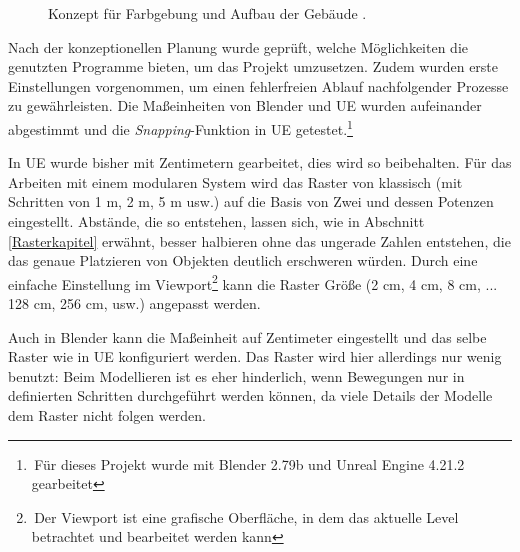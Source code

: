 \begin{figure}[!h]
\centering
  \caption{Konzept für Farbgebung und Aufbau der Gebäude \parencite{JapanConcept}.}
	\label{JapanKonzept}
\end{figure}
\newpage
Nach der konzeptionellen Planung wurde geprüft, welche Möglichkeiten die genutzten Programme bieten, um das Projekt umzusetzen. Zudem wurden erste Einstellungen vorgenommen, um einen fehlerfreien Ablauf nachfolgender Prozesse zu gewährleisten. Die Maßeinheiten von Blender und UE wurden aufeinander abgestimmt und die \textit{Snapping}-Funktion in UE getestet.\footnote{\,Für dieses Projekt wurde mit Blender 2.79b und Unreal Engine 4.21.2 gearbeitet}
\par
In UE wurde bisher mit Zentimetern gearbeitet, dies wird so beibehalten. Für das Arbeiten mit einem modularen System wird das Raster von klassisch (mit Schritten von 1 m, 2 m, 5 m usw.) auf die Basis von Zwei und dessen Potenzen eingestellt. Abstände, die so entstehen, lassen sich, wie in Abschnitt \ref{Rasterkapitel} erwähnt, besser halbieren ohne das ungerade Zahlen entstehen, die das genaue Platzieren von Objekten deutlich erschweren würden. Durch eine einfache Einstellung im Viewport\footnote{\,Der Viewport ist eine grafische Oberfläche, in dem das aktuelle Level betrachtet und bearbeitet werden kann} kann die Raster Größe (2 cm, 4 cm, 8 cm, ... 128 cm, 256 cm, usw.) angepasst werden.
\par
Auch in Blender kann die Maßeinheit auf Zentimeter eingestellt und das selbe Raster wie in UE konfiguriert werden. Das Raster wird hier allerdings nur wenig benutzt: Beim Modellieren ist es eher hinderlich, wenn Bewegungen nur in definierten Schritten durchgeführt werden können, da viele Details der Modelle dem Raster nicht folgen werden.
